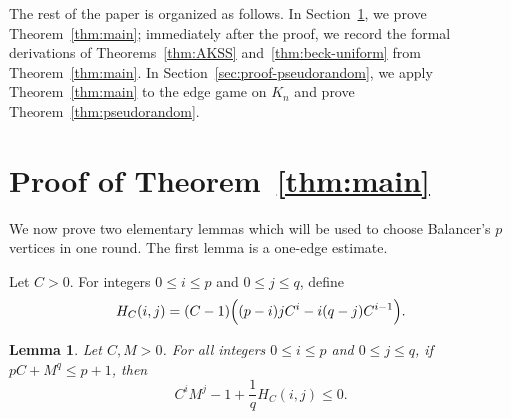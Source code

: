 \documentclass[twoside,12pt]{article}
\numberwithin{equation}{section}
\newtheorem{lemma}[theorem]{Lemma}
\begin{document}
The rest of the paper is organized as follows. In
Section~\ref{sec:proof-main}, we prove Theorem~\ref{thm:main}; immediately after the proof, we record the formal derivations of
Theorems~\ref{thm:AKSS} and~\ref{thm:beck-uniform} from Theorem~\ref{thm:main}.
In Section~\ref{sec:proof-pseudorandom}, we apply Theorem~\ref{thm:main}
to the edge game on $K_n$ and prove Theorem~\ref{thm:pseudorandom}.








\section{Proof of Theorem~\ref{thm:main}}\label{sec:proof-main}


We now prove two elementary lemmas which will be used to choose Balancer's $p$ vertices in one round. The first lemma is a one-edge estimate. 

Let $C>0$.
For integers $0\le i\le p$ and $0\le j\le q$, define
\begin{equation}\label{hcij}
H_C(i,j) = (C-1)\Bigl((p-i)jC^i-i(q-j)C^{i-1}\Bigr).
\end{equation}


\begin{lemma}\label{lem-1}
Let $C, M>0$.
For all integers $0\le i\le p$ and $0\le j\le q$, if $pC+M^q\le p+1$, then
\[
        C^iM^j-1+\frac1qH_C(i,j)\le0.
\]
\end{lemma}
\end{document}
